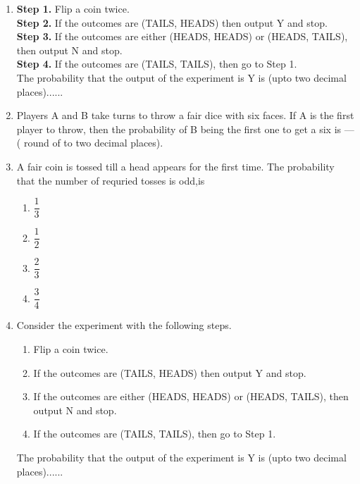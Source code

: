\begin{enumerate}[label=\thesection.\arabic*.,ref=\thesection.\theenumi]
%



\item \textbf{Step 1.} Flip a coin twice.\\
\textbf{Step 2.} If the outcomes are (TAILS, HEADS) then output Y and stop.\\
\textbf{Step 3.} If the outcomes are either (HEADS, HEADS) or (HEADS, TAILS), then output N and stop.\\
\textbf{Step 4.} If the outcomes are (TAILS, TAILS), then go to Step 1.\\
The probability that the output of the experiment is Y is (upto two decimal places)......
\\
%
\solution


%
\item Players A and B take turns to throw a fair dice with six faces. If A is the first player to throw, then the probability of B being the first one to get a six is --- ( round of to two decimal places). \\
\solution

%
\item A fair coin is tossed till a head appears for the first time. The probability that the number of requried tosses is odd,is\\
\begin{enumerate}
    \item $\dfrac{1}{3}$\\
    \item $\dfrac{1}{2}$\\
    \item $\dfrac{2}{3}$\\
    \item $\dfrac{3}{4}$
\end{enumerate}
\solution
  
%
\item  Consider the experiment with the following steps.
\begin{enumerate}
\item  Flip a coin twice.
\item If the outcomes are (TAILS, HEADS) then output Y and stop.
\item If the outcomes are either (HEADS, HEADS) or (HEADS, TAILS), then output N and stop.
\item If the outcomes are (TAILS, TAILS), then go to Step 1.
\end{enumerate}
The probability that the output of the experiment is Y is (upto two decimal places)......
\\

\end{enumerate}
